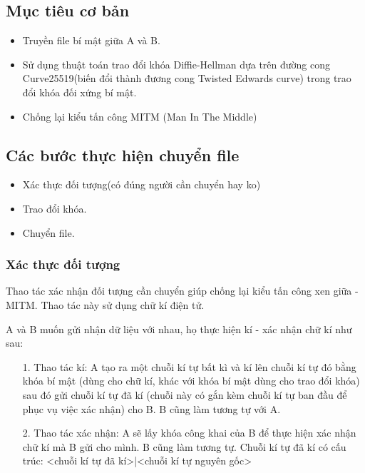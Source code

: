 \documentclass[a4paper,12pt]{report}
\begin{document}
\subsection*{Mục tiêu cơ bản}
\begin{itemize}
\item Truyền file bí mật giữa A và B.
\item Sử dụng thuật toán trao đổi khóa Diffie-Hellman dựa trên đường cong Curve25519(biến đổi thành đương cong Twisted Edwards curve) trong trao đổi khóa đối xứng bí mật.
\item Chống lại kiểu tấn công MITM (Man In The Middle)
\end{itemize}
\subsection*{Các bước thực hiện chuyển file}
\begin{itemize}
\item Xác thực đối tượng(có đúng người cần chuyển hay ko)
\item Trao đổi khóa.
\item Chuyển file.
\end{itemize}
\subsubsection*{Xác thực đối tượng}
Thao tác xác nhận đối tượng cần chuyển giúp chống lại kiểu tấn công xen giữa - MITM.
Thao tác này sử dụng chữ kí điện tử.

A và B muốn gửi nhận dữ liệu với nhau, họ thực hiện kí - xác nhận chữ kí như sau:
\begin{itemize}
\item[1. ] Thao tác kí: A tạo ra một chuỗi kí tự bất kì và kí lên chuỗi kí tự đó bằng khóa bí mật (dùng cho chữ kí, khác với khóa bí mật dùng cho trao đổi khóa) sau đó gửi chuỗi kí tự đã kí (chuỗi này có gắn kèm chuỗi kí tự ban đầu để phục vụ việc xác nhận) cho B. B cũng làm tương tự với A.
\item[2. ] Thao tác xác nhận: A sẽ lấy khóa công khai của B để thực hiện xác nhận chữ kí mà B gửi cho mình. B cũng làm tương tự. Chuỗi kí tự đã kí có cấu trúc: <chuỗi kí tự đã kí>|<chuỗi kí tự nguyên gốc>
\end{itemize}
\end{document}
